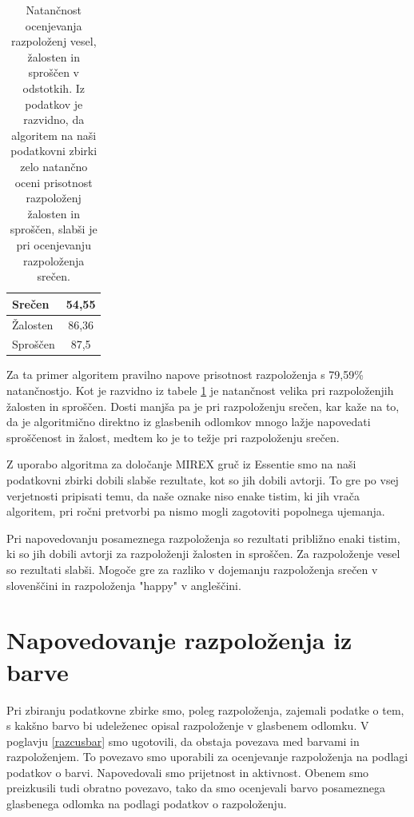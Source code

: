 \documentclass[a4paper, 12pt]{book}
\begin{document}
{\begin{table}[htb]
\begin{center}
\caption{Natančnost ocenjevanja razpoloženj vesel, žalosten in sproščen v odstotkih. Iz podatkov je razvidno, da algoritem na naši podatkovni zbirki zelo natančno oceni prisotnost razpoloženj žalosten in sproščen, slabši je pri ocenjevanju razpoloženja srečen. }
\begin{tabular}{|l|c|}
\hline
Srečen & 54,55\\ \hline
Žalosten & 86,36\\ \hline
Sproščen & 87,5\\ \hline

\end{tabular}
\label{natancnost_es_custva}
\end{center}
\end{table}

Za ta primer algoritem pravilno napove prisotnost razpoloženja s 79,59\% natančnostjo. Kot je razvidno iz tabele \ref{natancnost_es_custva} je natančnost velika pri razpoloženjih žalosten in sproščen. Dosti manjša pa je pri razpoloženju srečen, kar kaže na to, da je algoritmično direktno iz glasbenih odlomkov mnogo lažje napovedati sproščenost in žalost, medtem ko je to težje pri razpoloženju srečen. 

Z uporabo algoritma za določanje MIREX gruč iz Essentie smo na naši podatkovni zbirki dobili slabše rezultate, kot so jih dobili avtorji. To gre po vsej verjetnosti pripisati temu, da naše oznake niso enake tistim, ki jih vrača algoritem, pri ročni pretvorbi pa nismo mogli zagotoviti popolnega ujemanja. 

Pri napovedovanju posameznega razpoloženja so rezultati približno enaki tistim, ki so jih dobili avtorji za razpoloženji žalosten in sproščen. Za razpoloženje vesel so rezultati slabši. Mogoče gre za razliko v dojemanju razpoloženja srečen v slovenščini in razpoloženja "happy" v angleščini. 

\chapter{Napovedovanje razpoloženja iz barve}

Pri zbiranju podatkovne zbirke smo, poleg razpoloženja, zajemali podatke o tem, s kakšno barvo bi udeleženec opisal razpoloženje v glasbenem odlomku. V poglavju \ref{razcusbar} smo ugotovili, da obstaja povezava med barvami in razpoloženjem. To povezavo smo uporabili za ocenjevanje razpoloženja na podlagi podatkov o barvi. Napovedovali smo prijetnost in aktivnost. Obenem smo preizkusili tudi obratno povezavo, tako da smo ocenjevali barvo posameznega glasbenega odlomka na podlagi podatkov o razpoloženju.

}
\end{document}

